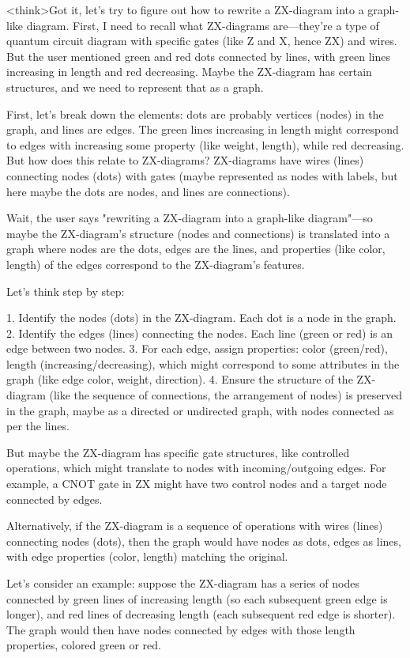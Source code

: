 <think>Got it, let's try to figure out how to rewrite a ZX-diagram into a graph-like diagram. First, I need to recall what ZX-diagrams are—they're a type of quantum circuit diagram with specific gates (like Z and X, hence ZX) and wires. But the user mentioned green and red dots connected by lines, with green lines increasing in length and red decreasing. Maybe the ZX-diagram has certain structures, and we need to represent that as a graph.

First, let's break down the elements: dots are probably vertices (nodes) in the graph, and lines are edges. The green lines increasing in length might correspond to edges with increasing some property (like weight, length), while red decreasing. But how does this relate to ZX-diagrams? ZX-diagrams have wires (lines) connecting nodes (dots) with gates (maybe represented as nodes with labels, but here maybe the dots are nodes, and lines are connections).

Wait, the user says "rewriting a ZX-diagram into a graph-like diagram"—so maybe the ZX-diagram's structure (nodes and connections) is translated into a graph where nodes are the dots, edges are the lines, and properties (like color, length) of the edges correspond to the ZX-diagram's features.

Let's think step by step:

1. Identify the nodes (dots) in the ZX-diagram. Each dot is a node in the graph.
2. Identify the edges (lines) connecting the nodes. Each line (green or red) is an edge between two nodes.
3. For each edge, assign properties: color (green/red), length (increasing/decreasing), which might correspond to some attributes in the graph (like edge color, weight, direction).
4. Ensure the structure of the ZX-diagram (like the sequence of connections, the arrangement of nodes) is preserved in the graph, maybe as a directed or undirected graph, with nodes connected as per the lines.

But maybe the ZX-diagram has specific gate structures, like controlled operations, which might translate to nodes with incoming/outgoing edges. For example, a CNOT gate in ZX might have two control nodes and a target node connected by edges.

Alternatively, if the ZX-diagram is a sequence of operations with wires (lines) connecting nodes (dots), then the graph would have nodes as dots, edges as lines, with edge properties (color, length) matching the original.

Let's consider an example: suppose the ZX-diagram has a series of nodes connected by green lines of increasing length (so each subsequent green edge is longer), and red lines of decreasing length (each subsequent red edge is shorter). The graph would then have nodes connected by edges with those length properties, colored green or red.

